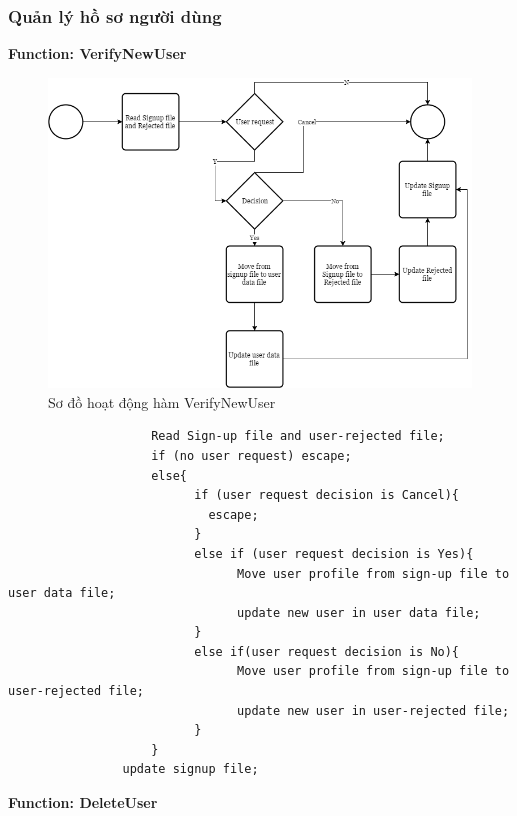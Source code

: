 \documentclass[12pt,a4paper]{report}
\begin{document}
            \subsubsection{Quản lý hồ sơ người dùng}
                \textbf{Function: VerifyNewUser}
                \begin{figure}[H]
                    \centering
                    \label{F:adduser}
                    \includegraphics[scale = .4]{adduser.png}
                    \caption{Sơ đồ hoạt động hàm VerifyNewUser}
                \end{figure}
                \begin{verbatim}
                    Read Sign-up file and user-rejected file;
                    if (no user request) escape;
                    else{
                          if (user request decision is Cancel){
                            escape;
                          }
                          else if (user request decision is Yes){
                                Move user profile from sign-up file to user data file;
                                update new user in user data file;
                          }
                          else if(user request decision is No){
                                Move user profile from sign-up file to user-rejected file;
                                update new user in user-rejected file;
                          }
                    }
                update signup file;
                \end{verbatim}
                \textbf{Function: DeleteUser}
\end{document}
